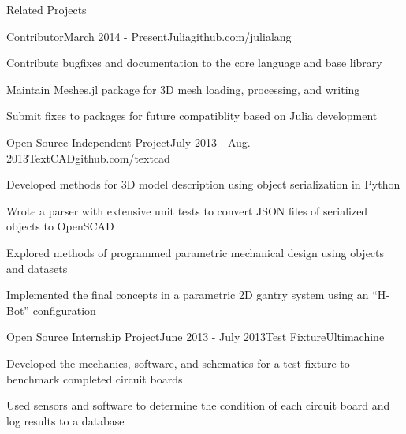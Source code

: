 \documentclass{./sjkelly_resume} 					%
\begin{document}
\begin{mainSection}{Related Projects}
	\begin{experienceSubsection}{Contributor}{March 2014 - Present}{Julia}{github.com/julialang}
		\item Contribute bugfixes and documentation to the core language and base library
		\item Maintain Meshes.jl package for 3D mesh loading, processing, and writing
		\item Submit fixes to packages for future compatiblity based on Julia development
	\end{experienceSubsection}
	\begin{experienceSubsection}{Open Source Independent Project}{July 2013 - Aug. 2013}{TextCAD}{github.com/textcad}
		\item Developed methods for 3D model description using object serialization in Python
		\item Wrote a parser with extensive unit tests to convert JSON files of serialized objects to OpenSCAD
		\item Explored methods of programmed parametric mechanical design using objects and datasets
		\item Implemented the final concepts in a parametric 2D gantry system using an ``H-Bot'' configuration
	\end{experienceSubsection}
	\begin{experienceSubsection}{Open Source Internship Project}{June 2013 - July 2013}{Test Fixture}{Ultimachine}
		\item Developed the mechanics, software, and schematics for a test fixture to benchmark completed circuit boards
		\item Used sensors and software to determine the condition of each circuit board and log results to a database
	\end{experienceSubsection}
\end{mainSection}
\end{document}
